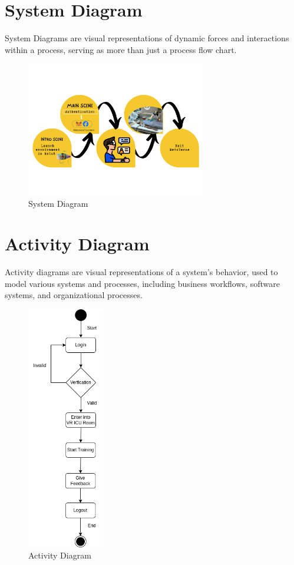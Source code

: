 \section{System Diagram}
System Diagrams are visual representations of dynamic forces and interactions within a process, serving as more than just a process flow chart.
\begin{figure}[h]
    \centering
    \includegraphics[width=0.7\textwidth, height=0.3\textheight]{Images/system.png}
    \caption{System Diagram}
    \label{fig:system-diagram}
\end{figure}





\section{Activity Diagram}
Activity diagrams are visual representations of a system's behavior, used to model various systems and processes, including business workflows, software systems, and organizational processes.
\begin{figure}[h]
    \centering
    \includegraphics[width=0.3\textwidth, height=0.6\textheight]{Images/Activity.drawio.png}
    \caption{Activity Diagram}
    \label{fig:system-diagram}
\end{figure}
